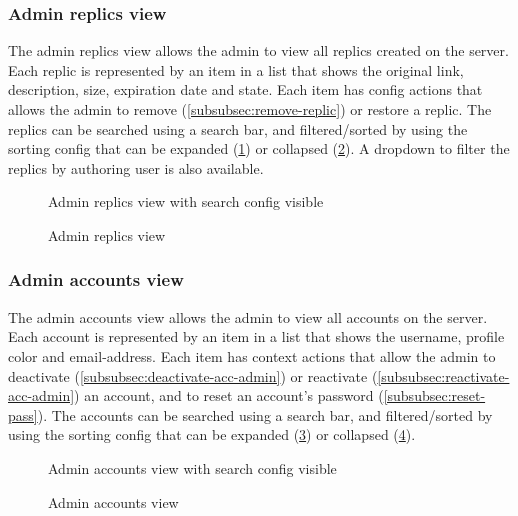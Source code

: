 \subsubsection{Admin replics view}
The admin replics view allows the admin to view all replics created on the server.
Each replic is represented by an item in a list that shows the original link, description, size, expiration date and state.
Each item has config actions that allows the admin to remove (\ref{subsubsec:remove-replic}) or restore a replic.
The replics can be searched using a search bar, and filtered/sorted by using the sorting config that can be expanded (\ref{fig:web-admin-replics-config-view}) or collapsed (\ref{fig:web-admin-replics-noconfig-view}).
A dropdown to filter the replics by authoring user is also available.
\begin{figure}
    \centering

    \caption{Admin replics view with search config visible}
    \label{fig:web-admin-replics-config-view}
\end{figure}
\begin{figure}
    \centering

    \caption{Admin replics view}
    \label{fig:web-admin-replics-noconfig-view}
\end{figure}

\subsubsection{Admin accounts view}
The admin accounts view allows the admin to view all accounts on the server.
Each account is represented by an item in a list that shows the username, profile color and email-address.
Each item has context actions that allow the admin to deactivate (\ref{subsubsec:deactivate-acc-admin}) or reactivate (\ref{subsubsec:reactivate-acc-admin}) an account, and to reset an account's password (\ref{subsubsec:reset-pass}).
The accounts can be searched using a search bar, and filtered/sorted by using the sorting config that can be expanded (\ref{fig:web-accounts-config-view}) or collapsed (\ref{fig:web-accounts-noconfig-view}).
\begin{figure}
    \centering

    \caption{Admin accounts view with search config visible}
    \label{fig:web-accounts-config-view}
\end{figure}
\begin{figure}
    \centering

    \caption{Admin accounts view}
    \label{fig:web-accounts-noconfig-view}
\end{figure}

